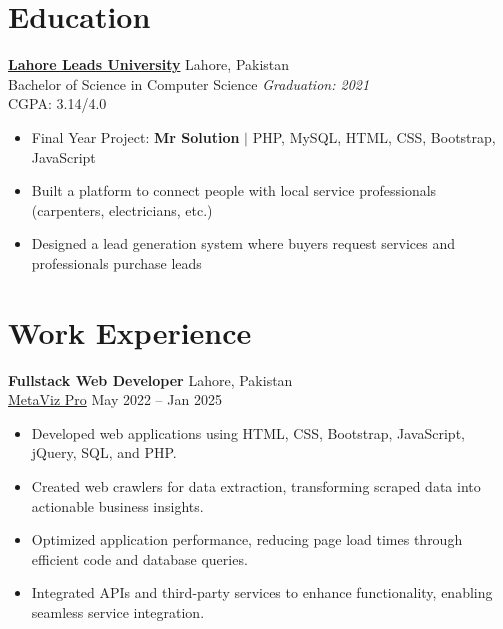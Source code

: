 \documentclass[a4paper,12pt]{article}
\begin{document}

\section{Education}

\textbf{\href{https://leads.edu.pk/}{Lahore Leads University}} \hfill Lahore, Pakistan \\
Bachelor of Science in Computer Science \hfill \textit{Graduation: 2021} \\
CGPA: 3.14/4.0

\begin{itemize}[leftmargin=*]
    \item Final Year Project: \textbf{Mr Solution} $|$ PHP, MySQL, HTML, CSS, Bootstrap, JavaScript
    \item Built a platform to connect people with local service professionals (carpenters, electricians, etc.)
    \item Designed a lead generation system where buyers request services and professionals purchase leads
\end{itemize}



\section{Work Experience}

\textbf{Fullstack Web Developer} \hfill Lahore, Pakistan \\
\href{https://metaviz.pro/}{MetaViz Pro} \hfill May 2022 -- Jan 2025

\begin{itemize}[leftmargin=*]
    \item Developed web applications using HTML, CSS, Bootstrap, JavaScript, jQuery, SQL, and PHP.
    \item Created web crawlers for data extraction, transforming scraped data into actionable business insights.
    \item Optimized application performance, reducing page load times through efficient code and database queries.
    \item Integrated APIs and third-party services to enhance functionality, enabling seamless service integration.
\end{itemize}
\end{document}
